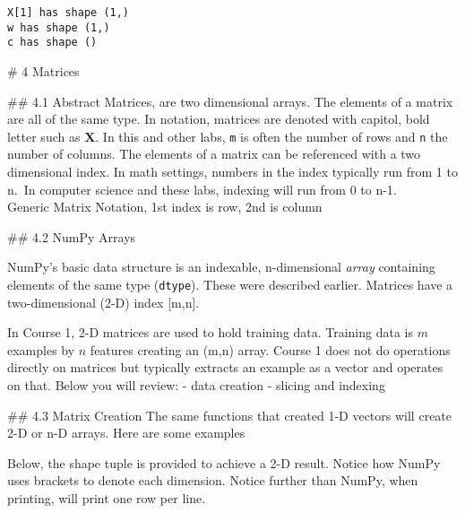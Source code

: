 \documentclass[11pt]{article}
\begin{document}
    \begin{Verbatim}[commandchars=\\\{\}]
X[1] has shape (1,)
w has shape (1,)
c has shape ()
    \end{Verbatim}

    \# 4 Matrices

    \#\# 4.1 Abstract Matrices, are two dimensional arrays. The elements of
a matrix are all of the same type. In notation, matrices are denoted
with capitol, bold letter such as \(\mathbf{X}\). In this and other
labs, \texttt{m} is often the number of rows and \texttt{n} the number
of columns. The elements of a matrix can be referenced with a two
dimensional index. In math settings, numbers in the index typically run
from 1 to n.~In computer science and these labs, indexing will run from
0 to n-1.\\

Generic Matrix Notation, 1st index is row, 2nd is column

    \#\# 4.2 NumPy Arrays

NumPy's basic data structure is an indexable, n-dimensional \emph{array}
containing elements of the same type (\texttt{dtype}). These were
described earlier. Matrices have a two-dimensional (2-D) index
{[}m,n{]}.

In Course 1, 2-D matrices are used to hold training data. Training data
is \(m\) examples by \(n\) features creating an (m,n) array. Course 1
does not do operations directly on matrices but typically extracts an
example as a vector and operates on that. Below you will review: - data
creation - slicing and indexing

    \#\# 4.3 Matrix Creation The same functions that created 1-D vectors
will create 2-D or n-D arrays. Here are some examples

    Below, the shape tuple is provided to achieve a 2-D result. Notice how
NumPy uses brackets to denote each dimension. Notice further than NumPy,
when printing, will print one row per line.
\end{document}
